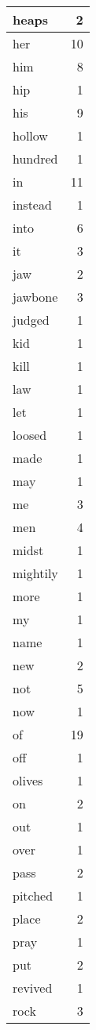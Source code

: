 \begin{center}
\begin{longtable}{l|r}
heaps & 2\\ \hline 
her & 10\\ \hline 
him & 8\\ \hline 
hip & 1\\ \hline 
his & 9\\ \hline 
hollow & 1\\ \hline 
hundred & 1\\ \hline 
in & 11\\ \hline 
instead & 1\\ \hline 
into & 6\\ \hline 
it & 3\\ \hline 
jaw & 2\\ \hline 
jawbone & 3\\ \hline 
judged & 1\\ \hline 
kid & 1\\ \hline 
kill & 1\\ \hline 
law & 1\\ \hline 
let & 1\\ \hline 
loosed & 1\\ \hline 
made & 1\\ \hline 
may & 1\\ \hline 
me & 3\\ \hline 
men & 4\\ \hline 
midst & 1\\ \hline 
mightily & 1\\ \hline 
more & 1\\ \hline 
my & 1\\ \hline 
name & 1\\ \hline 
new & 2\\ \hline 
not & 5\\ \hline 
now & 1\\ \hline 
of & 19\\ \hline 
off & 1\\ \hline 
olives & 1\\ \hline 
on & 2\\ \hline 
out & 1\\ \hline 
over & 1\\ \hline 
pass & 2\\ \hline 
pitched & 1\\ \hline 
place & 2\\ \hline 
pray & 1\\ \hline 
put & 2\\ \hline 
revived & 1\\ \hline 
rock & 3\\ \hline 

\end{longtable}
\end{center}
